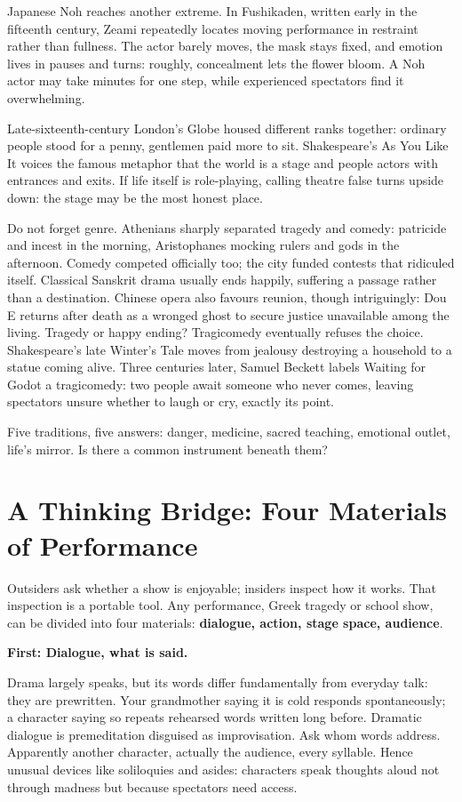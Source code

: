 Japanese Noh reaches another extreme. In Fushikaden, written early in the fifteenth century, Zeami repeatedly locates moving performance in restraint rather than fullness. The actor barely moves, the mask stays fixed, and emotion lives in pauses and turns: roughly, concealment lets the flower bloom. A Noh actor may take minutes for one step, while experienced spectators find it overwhelming.

Late-sixteenth-century London's Globe housed different ranks together: ordinary people stood for a penny, gentlemen paid more to sit. Shakespeare's As You Like It voices the famous metaphor that the world is a stage and people actors with entrances and exits. If life itself is role-playing, calling theatre false turns upside down: the stage may be the most honest place.

Do not forget genre. Athenians sharply separated tragedy and comedy: patricide and incest in the morning, Aristophanes mocking rulers and gods in the afternoon. Comedy competed officially too; the city funded contests that ridiculed itself. Classical Sanskrit drama usually ends happily, suffering a passage rather than a destination. Chinese opera also favours reunion, though intriguingly: Dou E returns after death as a wronged ghost to secure justice unavailable among the living. Tragedy or happy ending? Tragicomedy eventually refuses the choice. Shakespeare's late Winter's Tale moves from jealousy destroying a household to a statue coming alive. Three centuries later, Samuel Beckett labels Waiting for Godot a tragicomedy: two people await someone who never comes, leaving spectators unsure whether to laugh or cry, exactly its point.

Five traditions, five answers: danger, medicine, sacred teaching, emotional outlet, life's mirror. Is there a common instrument beneath them?

\section[Thinking Bridge: Performance Materials]{A Thinking Bridge: Four Materials of Performance}
Outsiders ask whether a show is enjoyable; insiders inspect how it works. That inspection is a portable tool. Any performance, Greek tragedy or school show, can be divided into four materials: \textbf{dialogue, action, stage space, audience}.

\textbf{First: Dialogue, what is said.}

Drama largely speaks, but its words differ fundamentally from everyday talk: they are prewritten. Your grandmother saying it is cold responds spontaneously; a character saying so repeats rehearsed words written long before. Dramatic dialogue is premeditation disguised as improvisation. Ask whom words address. Apparently another character, actually the audience, every syllable. Hence unusual devices like soliloquies and asides: characters speak thoughts aloud not through madness but because spectators need access.

